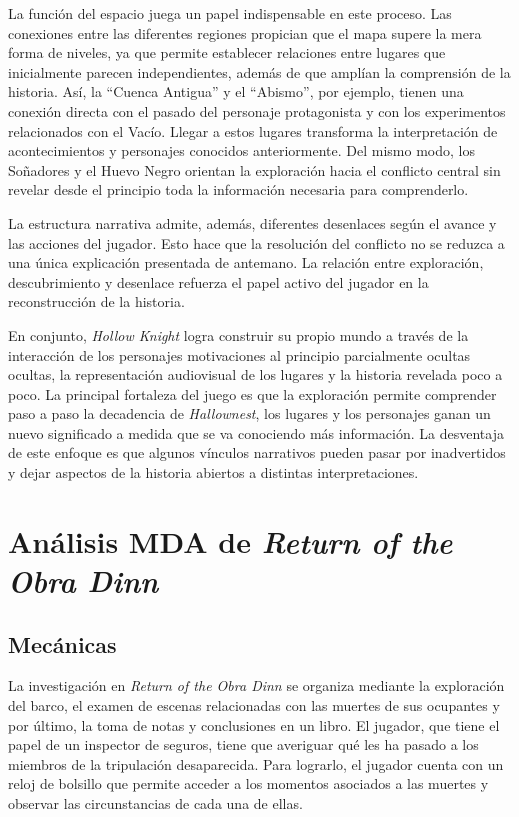 \documentclass[12pt,a4paper]{article}
\begin{document}
La función del espacio juega un papel indispensable en este proceso. Las conexiones entre las diferentes regiones propician que el mapa supere la mera forma de niveles, ya que permite establecer relaciones entre lugares que inicialmente parecen independientes, además de que amplían la comprensión de la historia. Así, la ``Cuenca Antigua'' y el ``Abismo'', por ejemplo, tienen una conexión directa con el pasado del personaje protagonista y con los experimentos relacionados con el Vacío. Llegar a estos lugares transforma la interpretación de acontecimientos y personajes conocidos anteriormente. Del mismo modo, los Soñadores y el Huevo Negro orientan la exploración hacia el conflicto central sin revelar desde el principio toda la información necesaria para comprenderlo.

La estructura narrativa admite, además, diferentes desenlaces según el avance y las acciones del jugador. Esto hace que la resolución del conflicto no se reduzca a una única explicación presentada de antemano. La relación entre exploración, descubrimiento y desenlace refuerza el papel activo del jugador en la reconstrucción de la historia.

En conjunto, \textit{Hollow Knight} logra construir su propio mundo a través de la interacción de los personajes motivaciones al principio parcialmente ocultas ocultas, la representación audiovisual de los lugares y la historia revelada poco a poco. La principal fortaleza del juego es que la exploración permite comprender paso a paso la decadencia de \textit{Hallownest}, los lugares y los personajes ganan un nuevo significado a medida que se va conociendo más información. La desventaja de este enfoque es que algunos vínculos narrativos pueden pasar por inadvertidos y dejar aspectos de la historia abiertos a distintas interpretaciones.

\section{Análisis MDA de \textit{Return of the Obra Dinn}}
\subsection{Mecánicas}
La investigación en \textit{Return of the Obra Dinn} se organiza mediante la exploración del barco, el examen de escenas relacionadas con las muertes de sus ocupantes y por último, la toma de notas y conclusiones en un libro. El jugador, que tiene el papel de un inspector de seguros, tiene que averiguar qué les ha pasado a los miembros de la tripulación desaparecida. Para lograrlo, el jugador cuenta con un reloj de bolsillo que permite acceder a los momentos asociados a las muertes y observar las circunstancias de cada una de ellas.
\end{document}
